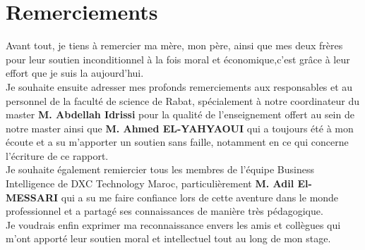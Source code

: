 \chapter*{\vspace{1.2in} Remerciements }
\vspace{0.5in}


Avant tout, je tiens à remercier ma mère, mon père, ainsi que mes deux frères pour leur soutien inconditionnel à la fois moral et économique,c’est grâce à leur effort que je suis la aujourd’hui. \\

Je souhaite ensuite adresser mes profonds remerciements aux responsables et au personnel de la faculté de science de Rabat, spécialement à notre coordinateur du master \textbf{M. Abdellah Idrissi} pour la qualité de l’enseignement offert au sein de notre master ainsi que \textbf{M. Ahmed EL-YAHYAOUI} qui a toujours été à mon écoute et a su m’apporter un soutien sans faille, notamment en ce qui concerne l’écriture de ce rapport. \\

Je souhaite également remiercier tous les membres de l’équipe Business Intelligence de DXC Technology Maroc, particulièrement \textbf{M. Adil El-MESSARI} qui a su me faire confiance lors de cette aventure dans le monde professionnel et a partagé ses connaissances de manière très pédagogique.\\ %

Je voudrais enfin exprimer ma reconnaissance envers les amis et collègues qui m’ont apporté leur soutien moral et intellectuel tout au long de mon stage.



